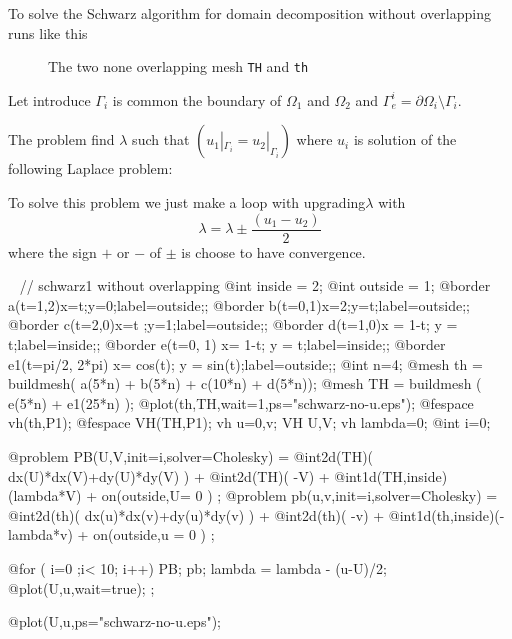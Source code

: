\documentclass[a4paper,twoside,12pt]{book}
\def\p{\partial}
\begin{document}
To solve
the Schwarz algorithm for domain decomposition without overlapping  runs like this

\begin{figure}[hbt]
\caption{ The two none overlapping mesh \texttt{TH} and \texttt{th}  }
\end{figure}

Let introduce  $\Gamma_i$ is  common the boundary of $\Omega_1$ and
$\Omega_2$ and    $\Gamma_e^i= \p \Omega_i \setminus \Gamma_i$.

The problem  find  $\lambda$ such that $ (u_1|_{\Gamma_i}=u_2|_{\Gamma_i}) $
where  $u_i$ is solution of the following Laplace problem:

To solve this problem we just make a loop
with upgrading$\lambda$ with
$$\lambda = \lambda {\pm} \frac{(u_1-u_2)}{2}$$
where the sign $+$ or $-$ of ${\pm}$ is choose to have convergence.

\begin{example}~
\bFF
// schwarz1 without overlapping
@int inside = 2;
@int outside = 1;
@border a(t=1,2){x=t;y=0;label=outside;};
@border b(t=0,1){x=2;y=t;label=outside;};
@border c(t=2,0){x=t ;y=1;label=outside;};
@border d(t=1,0){x = 1-t; y = t;label=inside;};
@border e(t=0, 1){ x= 1-t; y = t;label=inside;};
@border e1(t=pi/2, 2*pi){ x= cos(t); y = sin(t);label=outside;};
@int n=4;
@mesh th = buildmesh( a(5*n) + b(5*n) + c(10*n) + d(5*n));
@mesh TH = buildmesh ( e(5*n) + e1(25*n) );
@plot(th,TH,wait=1,ps="schwarz-no-u.eps");
@fespace vh(th,P1);
@fespace VH(TH,P1);
vh u=0,v; VH U,V;
vh lambda=0;
@int i=0;

@problem PB(U,V,init=i,solver=Cholesky) = 
    @int2d(TH)( dx(U)*dx(V)+dy(U)*dy(V) )
  + @int2d(TH)( -V) 
  + @int1d(TH,inside)(lambda*V) +    on(outside,U= 0 ) ;
@problem pb(u,v,init=i,solver=Cholesky) = 
    @int2d(th)( dx(u)*dx(v)+dy(u)*dy(v) )
  + @int2d(th)( -v) 
  + @int1d(th,inside)(-lambda*v) +    on(outside,u = 0 ) ;



@for ( i=0 ;i< 10; i++)
{
   PB;
   pb;
   lambda = lambda - (u-U)/2;
   @plot(U,u,wait=true);
};

@plot(U,u,ps="schwarz-no-u.eps");

\eFF
\end{example}
\end{document}
